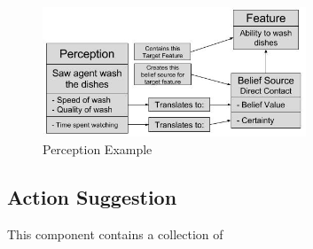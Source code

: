 \begin{figure}[hbt]
    \centering
    \includegraphics[width=0.7\textwidth]{figures/PerceptionsDiagram.jpg}
    \caption{Perception Example}
    \label{fig:Perceptions Diagram}
\end{figure}

\subsection{Action Suggestion}
This component contains a collection of 


